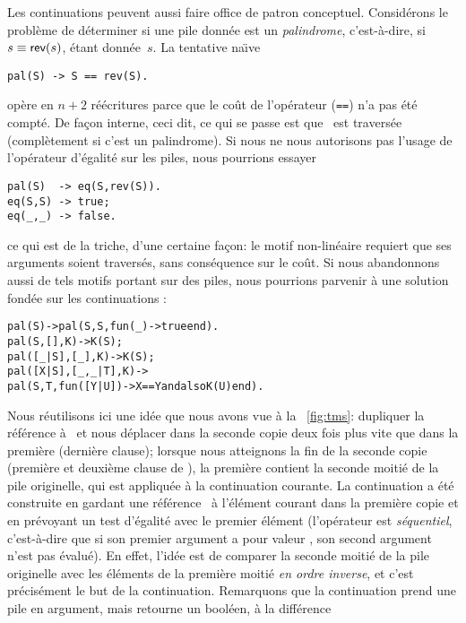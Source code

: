Les continuations peuvent aussi faire office de patron
conceptuel. Considérons le problème de déterminer si une pile donnée
est un \emph{palindrome}, c'est-à-dire, si \(s
\equiv \textsf{rev}(s)\), étant donnée~\(s\). La tentative na\"{\i}ve
\begin{verbatim}
pal(S) -> S == rev(S).
\end{verbatim}
opère en \(n+2\) réécritures parce que le coût de l'opérateur
(\texttt{==}) n'a pas été compté. De façon interne, ceci dit, ce qui
se passe est que ~est traversée (complètement si c'est un
palindrome). Si nous ne nous autorisons pas l'usage de l'opérateur
d'égalité sur les piles, nous pourrions essayer
\begin{verbatim}
pal(S)  -> eq(S,rev(S)).
eq(S,S) -> true;
eq(_,_) -> false.
\end{verbatim}
ce qui est de la triche, d'une certaine façon: le motif non-linéaire
  requiert que ses arguments soient traversés, sans
conséquence sur le coût. Si nous abandonnons aussi de tels motifs
portant sur des piles, nous pourrions parvenir à une solution fondée
sur les continuations \citep{DanvyGoldberg_2001}:
\begin{alltt}
pal(S)               -> pal(S,S,fun(\_) -> true end).
pal(    S,     [],K) -> K(S);\hfill% \emph{Longueur paire}
pal([\_|S],    [\_],K) -> K(S);\hfill% \emph{Longueur impaire}
pal([X|S],[\_,\_|T],K) ->
\hfill{}pal(S,T,fun([Y|U]) -> X == Y andalso K(U) end).
\end{alltt}
Nous réutilisons ici une idée que nous avons vue à la
\fig~\vref{fig:tms}: dupliquer la référence à~ et nous
déplacer dans la seconde copie deux fois plus vite que dans la
première (dernière clause); lorsque nous atteignons la fin de la
seconde copie (première et deuxième clause de ), la
première contient la seconde moitié de la pile originelle, qui est
appliquée à la continuation courante. La continuation a été construite
en gardant une référence~ à l'élément courant dans la
première copie et en prévoyant un test d'égalité avec le premier
élément (l'opérateur  est \emph{séquentiel},
c'est-à-dire que si son premier argument a pour valeur
, son second argument n'est pas évalué). En effet,
l'idée est de comparer la seconde moitié de la pile originelle avec
les éléments de la première moitié \emph{en ordre inverse}, et c'est
précisément le but de la continuation. Remarquons que la continuation
prend une pile en argument, mais retourne un booléen, à la différence
